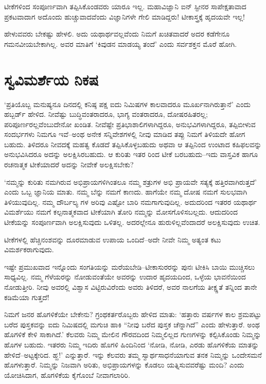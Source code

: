ಟೀಕೆಗಳಿಂದ ಸಂಪೂರ್ಣವಾಗಿ ತಪ್ಪಿಸಿಕೊಂಡವರು ಯಾರೂ ಇಲ್ಲ. ಮಹಾವಿಜ್ಞಾನಿ ಐನ್ ಸ್ಟೀನರ ಸಾಪೇಕ್ಷತಾವಾದ ಪ್ರಕಟವಾದಾಗ ಅದೊಂದು ಹುಚ್ಚುವಾದವೆಂದು ವಿಜ್ಞಾನಿಗಳೇ ಗೇಲಿ ಮಾಡಿದ್ದರು! ಟೀಕಾಸ್ತ್ರಕ್ಕೆ ಹೃದಯವೇ ಇಲ್ಲ!

ಹೇಳುವವರು ಬೇಕಷ್ಟು ಹೇಳಲಿ. ಅದು ಯಥಾರ್ಥವಲ್ಲವೆಂದು ನಿಮಗೆ ಖಚಿತವಾದರೆ ಅದರ ಕಡೆಗೇನೂ ಗಮನವೀಯಬೇಕಾಗಿಲ್ಲ. ಅವರ ಮಾತಿಗೆ ‘ಕಿವುಡನ ಮಾಡಯ್ಯ ತಂದೆ’ ಎಂದು ಸರ್ವಶಕ್ತನ ಮೊರೆ ಹೋಗಿ.


\section{ಸ್ವವಿಮರ್ಶೆಯ ನಿಕಷ}

‘ಪ್ರತಿಯೊಬ್ಬ ಮನುಷ್ಯನೂ ದಿನದಲ್ಲಿ ಕನಿಷ್ಠ ಪಕ್ಷ ಐದು ನಿಮಿಷಗಳ ಕಾಲವಾದರೂ ಮೂರ್ಖನಾಗಿರುತ್ತಾನೆ’ ಎಂದು ಹಬ್ಬರ್ಡ್ ಹೇಳಿದ. ನೀವೆಷ್ಟು ಬುದ್ಧಿವಂತರಾದರೂ, ಭಾಗ್ಯ ವಂತರಾದರೂ, ದೋಷರಹಿತರಲ್ಲ; ಪರಿಪೂರ್ಣರಲ್ಲವೆಂಬುದೇನೋ ಖಂಡಿತ. ನೀವೆಷ್ಟೇ ಪ್ರತಿಭಾಶಾಲಿಗಳಾಗಿದ್ದರೂ, ಅನುಭವಿಗಳಾಗಿದ್ದರೂ, ತಪ್ಪಿಬೀಳುವ ಸಂದರ್ಭಗಳು ನಿಮಗೂ ಇವೆ–ಅಂಥ ಅನೇಕ ಸನ್ನಿವೇಶಗಳಲ್ಲಿ ನೀವು ಮಾಡಿದ ತಪ್ಪು ನಿಮಗೆ ತಿಳಿಯದೇ ಹೋಗ ಬಹುದು. ತಿಳಿದರೂ ನೀವದಕ್ಕೆ ಮಹತ್ವ ಕೊಡದೆ ತಪ್ಪಿಸಿಕೊಳ್ಳಬಹುದು ಅಥವಾ ಆ ತಪ್ಪಿನಿಂದ ಉಂಟಾದ ಕಹಿಫಲವನ್ನು ಅನುಭವಿಸಿದರೂ ಅದನ್ನು ಅಲಕ್ಷಿಸಿರಬಹುದು. ಆ ಕುರಿತು ಇತರ ರಿಂದ ಟೀಕೆ ಬರಬಹುದು–ಇದು ವಾಸ್ತವಿಕ ಹಾಗೂ ರಚನಾತ್ಮಕ ಟೀಕೆಯಾದರೆ ಅದನ್ನು ನೀವೇಕೆ ಅಲಕ್ಷಿಸಬೇಕು?

‘ನಮ್ಮನ್ನು ಕುರಿತು ನಮಗಿರುವ ಅಭಿಪ್ರಾಯಗಳಿಗಿಂತಲೂ ನಮ್ಮ ಶತ್ರುಗಳ ಅಭಿ ಪ್ರಾಯವೇ ಸತ್ಯಕ್ಕೆ ಹತ್ತಿರವಾಗಿರುತ್ತದೆ’ ಎಂದು ಒಬ್ಬ ಜ್ಞಾನಿಯ ಮಾತು. ನಮ್ಮ ಬೆನ್ನು ನಮಗೆ ಕಾಣದು. ಹಾಗೆಯೇ ನಮ್ಮ ದೋಷ ನಮಗೆ ಸುಲಭವಾಗಿ ತಿಳಿಯುವುದಿಲ್ಲ. ನಮ್ಮ ದೌರ್ಬಲ್ಯ ಗಳ ಅರಿವು ಎಷ್ಟೋ ಬಾರಿ ನಮಗಾಗುವುದಿಲ್ಲ. ಅದುದರಿಂದ ಇತರರ ಯಥಾರ್ಥ ವಿಮರ್ಶೆಯು ನಮಗೆ ಕಲ್ಪನಾತ್ಮಕವಾದ ಟೀಕೆಯಾಗಿ ತೋರಿ ನಮ್ಮನ್ನು ಮೋಸಗೊಳಿಸಬಲ್ಲದು. ಆದುದರಿಂದ ಟೀಕೆಯನ್ನು ಸಂಪೂರ್ಣವಾಗಿ ಅಲಕ್ಷಿಸುವುದು ಒಳಿತಲ್ಲ. ಅದರಲ್ಲೇನೂ ಹುರುಳಿಲ್ಲವೆಂದಾದರೆ ಅಲಕ್ಷಿಸುವುದು ಉಚಿತ.

ಟೀಕೆಗಳಲ್ಲಿ ಹೆಚ್ಚಿನಂಶವನ್ನು ದೂರಮಾಡುವ ಉಪಾಯ ಒಂದಿದೆ–ಅದೇ ನೀವೇ ನಿಮ್ಮ ಅತ್ಯಂತ ಕಟು ವಿಮರ್ಶಕರಾಗುವುದು.

ಇಷ್ಟೇ ಪ್ರಮುಖವಾದ ಇನ್ನೊಂದು ಸಂಗತಿಯನ್ನು ಮರೆಯಬೇಡಿ–ಟೀಕಾಸುರರನ್ನು ಪುನಃ ಟೀಕಿಸಿ ಬಾಯಿ ಮುಚ್ಚಿಸಲು ಸಾಧ್ಯವಿಲ್ಲ. ನಮ್ಮ ಗೆಳೆಯರನ್ನು ನೋಡುವಂತೆಯೇ ಅವರನ್ನು ಉದಾರ ಹೃದಯದಿಂದ, ಒಳ್ಳೆಯ ಭಾವನೆಯಿಂದ ನೋಡುತ್ತೀರಿ. ನೀವು ಅವರಲ್ಲಿ ವಿಶ್ವಾಸ ವಿಟ್ಟಿರುವಿರೆಂದು ಅವರು ತಿಳಿದರೆ, ಅವರ ನಾಲಗೆಯ ತೀಕ್ಷ್ಣತೆ ತನ್ನಿಂದ ತಾನೇ ಕಡಿಮೆಯಾ ಗುತ್ತದೆ!

ನಿಮಗೆ ಜನರ ಹೊಗಳಿಕೆಯೇ ಬೇಕೇನು? ಗ್ರಂಥಕರ್ತರೊಬ್ಬರು ಹೇಳಿದ ಮಾತು: ‘ಹತ್ತಾರು ವರ್ಷಗಳ ಕಾಲ ಶ್ರಮಪಟ್ಟು ಬರೆದ ಪುಸ್ತಕವನ್ನು ಐದು ನಿಮಿಷದಲ್ಲಿ ಮಗುಚಿ ಹಾಕಿ “ನೀವು ಬರೆದ ಪುಸ್ತಕ ಚೆನ್ನಾಗಿದೆ” ಎಂದು ಹೇಳುತ್ತಾರೆ. ಅಂಥ ಹೊಗಳಿಕೆ ಕೇಳಿ ಸಾಕಾಗಿದೆ.’ ಕೆಲವರು ನಿಮ್ಮ ಮೇಲಿನ ಗೌರವದಿಂದ ನಿಮ್ಮಲಿಲ್ಲದ ಗುಣಗಳನ್ನು ಕಲ್ಪಿಸಿಕೊಂಡು ನಿಮ್ಮನ್ನು ಹೊಗಳ ಬಹುದು. ಇತರರು ನಿಮ್ಮ ಇದಿರು ಹೊಗಳಿ ಹಿಂದಿನಿಂದ ‘ನೋಡಿ, ನೋಡಿ, ಎರಡು ಹೊಗಳಿಕೆಯ ಮಾತನ್ನು ಹೇಳಿದೆ–ಅಟ್ಟಕ್ಕೇರಿದ. ಹ್ಹ!’ ಎನ್ನುತ್ತಾರೆ. ಇನ್ನು ಕೆಲವರು ತಮ್ಮ ಸ್ವಾರ್ಥಸಾಧನೆಯಾಗುವ ತನಕ ನಿಮ್ಮನ್ನು ಒಂದೇಸಮನೆ ಹೊಗಳುತ್ತಾರೆ. ನಿಮ್ಮನ್ನು ನಿಜವಾಗಿ ಅರಿತು, ಅಭಿಪ್ರಾಯಗಳನ್ನು ಕೊಡಲು ಯತ್ನಿಸುವವರೆಷ್ಟು ಮಂದಿ? ಎಂದು ಯೋಚಿಸಿದಾಗ, ಹೊಗಳಿಕೆಯ ಕೈಗೊಂಬೆ ನೀವಾಗಲಾರಿರಿ.

